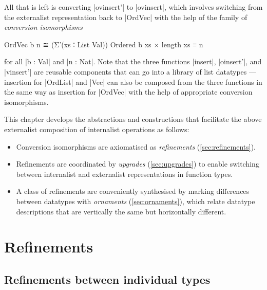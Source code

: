 All that is left is converting |ovinsert'| to |ovinsert|, which involves switching from the externalist representation back to |OrdVec| with the help of the family of \emph{conversion isomorphisms}
\begin{code}
OrdVec b n ≅ (Σ'(xs ∶ List Val)) Ordered b xs × length xs ≡ n
\end{code}
for all |b : Val| and |n : Nat|.
Note that the three functions |insert|, |oinsert'|, and |vinsert'| are reusable components that can go into a library of list datatypes --- insertion for |OrdList| and |Vec| can also be composed from the three functions in the same way as insertion for |OrdVec| with the help of appropriate conversion isomorphisms.

This chapter develops the abstractions and constructions that facilitate the above externalist composition of internalist operations as follows:
\begin{itemize}
\item Conversion isomorphisms are axiomatised as \emph{refinements} (\autoref{sec:refinements}).
\item Refinements are coordinated by \emph{upgrades} (\autoref{sec:upgrades}) to enable switching between internalist and externalist representations in function types.
\item A class of refinements are conveniently synthesised by marking differences between datatypes with \emph{ornaments} (\autoref{sec:ornaments}), which relate datatype descriptions that are vertically the same but horizontally different.
\end{itemize}


\section{Refinements}
\label{sec:refinements}

\subsection{Refinements between individual types}


